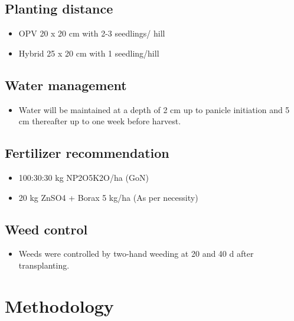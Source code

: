 \documentclass[12pt,]{article}
\providecommand{\tightlist}{%
  \setlength{\itemsep}{0pt}\setlength{\parskip}{0pt}}
\begin{document}
\hypertarget{planting-distance}{%
\subsection{Planting distance}\label{planting-distance}}

\begin{itemize}
\tightlist
\item
  OPV 20 x 20 cm with 2-3 seedlings/ hill
\item
  Hybrid 25 x 20 cm with 1 seedling/hill
\end{itemize}

\hypertarget{water-management}{%
\subsection{Water management}\label{water-management}}

\begin{itemize}
\tightlist
\item
  Water will be maintained at a depth of 2 cm up to panicle initiation and 5 cm thereafter up to one week before harvest.
\end{itemize}

\hypertarget{fertilizer-recommendation}{%
\subsection{Fertilizer recommendation}\label{fertilizer-recommendation}}

\begin{itemize}
\tightlist
\item
  100:30:30 kg NP2O5K2O/ha (GoN)
\item
  20 kg ZnSO4 + Borax 5 kg/ha (As per necessity)
\end{itemize}

\hypertarget{weed-control}{%
\subsection{Weed control}\label{weed-control}}

\begin{itemize}
\tightlist
\item
  Weeds were controlled by two-hand weeding at 20 and 40 d after transplanting.
\end{itemize}

\hypertarget{methodology}{%
\section{Methodology}\label{methodology}}
\end{document}
